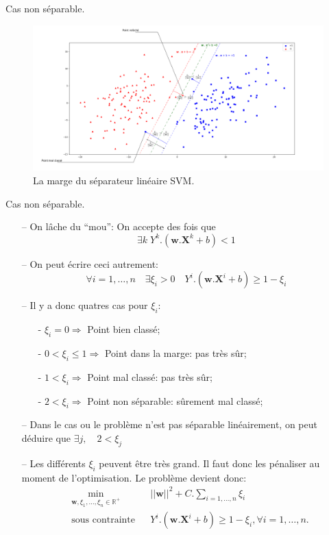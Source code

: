 \documentclass[9pt]{beamer}
\begin{document}
	\begin{frame}{Cas non séparable.}
		\begin{figure}[H]
			\includegraphics[width=\textwidth]{stable_margin}
			\caption{\label{fig::stable_margin} La marge du séparateur linéaire SVM.}
		\end{figure}
	\end{frame}

	\begin{frame}{Cas non séparable.}
		\begin{itemize}
			\item[--] On lâche du ``mou'': On accepte des fois que
			$$\exists k \; Y^k.(\textbf{w}.\textbf{X}^k + b) < 1$$
			\item[--] On peut écrire ceci autrement:
			$$\forall i=1,\dots,n \quad \exists \xi_i > 0 \quad Y^i.(\textbf{w}.\textbf{X}^i + b) \geq 1 - \xi_i$$

			\item[--] Il y a donc quatres cas pour $ \xi_i $:
			\begin{itemize}
				\item[-] $\xi_i = 0 \Rightarrow$ Point bien classé;
				\item[-] $0 < \xi_i \leq 1 \Rightarrow$ Point dans la marge: pas très sûr;
				\item[-] $1 < \xi_i \Rightarrow$ Point mal classé: pas très sûr;
				\item[-] $2 < \xi_i \Rightarrow$ Point non séparable: sûrement mal classé;
			\end{itemize}

			\item[--] Dans le cas ou le problème n'est pas séparable linéairement, on peut déduire que
			$\exists j, \quad 2 < \xi_j$

			\item[--] Les différents $\xi_i$ peuvent être très grand. Il faut donc les pénaliser au moment de l'optimisation. Le problème devient donc:
			\begin{equation}
				\begin{aligned}
				& \min_{\textbf{w}, \xi_1,\dots,\xi_n \in \mathbb{R}^+}
				& & {\vert\vert \textbf{w} \vert\vert}^2 + C.\sum_{i=1,\dots,n}\xi_i\\
				& \text{sous contrainte}
				& & Y^i.(\textbf{w}.\textbf{X}^i + b) \geq 1 - \xi_i , \forall i = 1, \dots, n.
				\end{aligned}
			\end{equation}
		\end{itemize}
	\end{frame}
\end{document}
